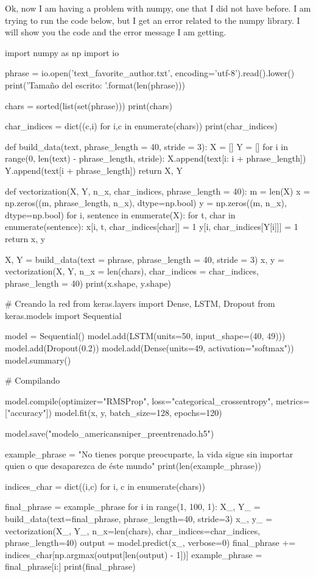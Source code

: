 Ok, now I am having a problem with numpy, one that I did not have before. I am trying to run the code below, but I get an error related to the numpy library. I will show you the code and the error message I am getting.

import numpy as np
import io

phrase = io.open('text_favorite_author.txt', encoding='utf-8').read().lower()
print('Tamaño del escrito: {}'.format(len(phrase)))

chars = sorted(list(set(phrase)))
print(chars)

char_indices = dict((c,i) for i,c in enumerate(chars))
print(char_indices)

def build_data(text, phrase_length = 40, stride = 3):
    X = []
    Y = []
    for i in range(0, len(text) - phrase_length, stride):
        X.append(text[i: i + phrase_length])
        Y.append(text[i + phrase_length])
    return X, Y

def vectorization(X, Y, n_x, char_indices, phrase_length = 40):
    m = len(X)
    x = np.zeros((m, phrase_length, n_x), dtype=np.bool)
    y = np.zeros((m, n_x), dtype=np.bool)
    for i, sentence in enumerate(X):
        for t, char in enumerate(sentence):
            x[i, t, char_indices[char]] = 1
        y[i, char_indices[Y[i]]] = 1
    return x, y

X, Y = build_data(text = phrase, phrase_length = 40, stride = 3)
x, y = vectorization(X, Y, n_x = len(chars), char_indices = char_indices, phrase_length = 40)
print(x.shape, y.shape)

# Creando la red
from keras.layers import Dense, LSTM, Dropout
from keras.models import Sequential

model = Sequential()
model.add(LSTM(units=50, input_shape=(40, 49)))
model.add(Dropout(0.2))
model.add(Dense(units=49, activation="softmax"))
model.summary()

# Compilando

model.compile(optimizer="RMSProp", loss="categorical_crossentropy", metrics=["accuracy"])
model.fit(x, y, batch_size=128, epochs=120)

model.save("modelo_americansniper_preentrenado.h5")

example_phrase = "No tienes porque preocuparte, la vida sigue sin importar quien o que desaparezca de éste mundo"
print(len(example_phrase))

indices_char = dict((i,c) for i, c in enumerate(chars))

final_phrase = example_phrase
for i in range(1, 100, 1):
    X_, Y_ = build_data(text=final_phrase, phrase_length=40, stride=3)
    x_, y_ = vectorization(X_, Y_, n_x=len(chars), char_indices=char_indices, phrase_length=40)
    output = model.predict(x_, verbose=0)
    final_phrase += indices_char[np.argmax(output[len(output) - 1])]
    example_phrase = final_phrase[i:]
print(final_phrase)

